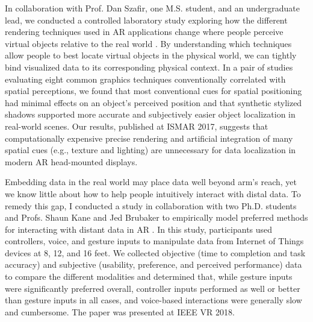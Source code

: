 \documentclass[11pt]{article}
\begin{document}
In collaboration with Prof. Dan Szafir, one M.S. student, and an undergraduate lead, we conducted a controlled laboratory study exploring how the different rendering techniques used in AR applications change where people perceive virtual objects relative to the real world \cite{diaz2017designing}. By understanding which techniques allow people to best locate virtual objects in the physical world, we can tightly bind visualized data to its corresponding physical context. In a pair of studies evaluating eight common graphics techniques conventionally correlated with spatial perceptions, we found that most conventional cues for spatial positioning had minimal effects on an object's perceived position and that synthetic stylized shadows supported more accurate and subjectively easier object localization in real-world scenes. Our results, published at ISMAR 2017,
 suggests that computationally expensive precise rendering and artificial integration of many spatial cues (e.g., texture and lighting) are unnecessary for data localization in modern AR head-mounted displays. 
 
Embedding data in the real world may place data well beyond arm's reach, yet we know little about how to help people intuitively interact with distal data.
To remedy this gap, I conducted a study in collaboration with two Ph.D. students and Profs. Shaun Kane and Jed Brubaker to empirically model preferred methods for interacting with distant data in AR \cite{whitlock2018Distal}. In this study, participants used controllers, voice, and gesture inputs to manipulate data from Internet of Things devices at 8, 12, and 16 feet. We collected objective (time to completion and task accuracy) and subjective (usability, preference, and perceived performance) data to compare the different modalities and determined that, while gesture inputs were significantly preferred overall, controller inputs performed as well or better than gesture inputs in all cases, and voice-based interactions were generally slow and cumbersome. The paper was presented at IEEE VR 2018. 
\end{document}
